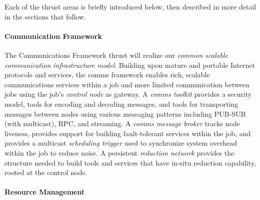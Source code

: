 \documentclass[10pt]{article}
\begin{document}
Each of the thrust areas is briefly introduced below, then described in
more detail in the sections that follow.

\paragraph{Communication Framework}
The Communications Framework thrust will
realize our {\em common scalable communication infrastructure model}.
Building upon mature and portable Internet protocols and services,
the comms framework enables rich, scalable communications services
within a job and more limited communication between jobs using
the job's {\em control node} as gateway.
A {\em comms toolkit} provides a security model, tools for
encoding and decoding messages, and tools for transporting messages between
nodes using various messaging patterns including PUB-SUB (with multicast),
RPC, and streaming.
A {\em comms message broker} tracks node liveness, provides support for
building fault-tolerant services within the job,
and provides a multicast {\em scheduling trigger} used to synchronize
system overhead within the job to reduce noise.
A persistent {\em reduction network}
provides the structure needed to build tools and services that have
in-situ reduction capability, rooted at the control node.

\paragraph{Resource Management}
\end{document}
